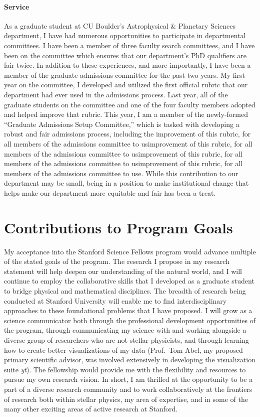 \documentclass[aps, pre, onecolumn, nofootinbib, notitlepage, groupedaddress, amsfonts, amssymb, amsmath]{revtex4-1}
\begin{document}
\paragraph*{Service}
As a graduate student at CU Boulder's Astrophysical \& Planetary Sciences department, I have had numerous opportunities to participate in departmental committees.
I have been a member of three faculty search committees, and I have been on the committee which ensures that our department's PhD qualifiers are fair twice.
In addition to these experiences, and more importantly, I have been a member of the graduate admissions committee for the past two years.
My first year on the committee, I developed and utilized the first official rubric that our department had ever used in the admissions process.
Last year, all of the graduate students on the committee and one of the four faculty members adopted and helped improve that rubric.
This year, I am a member of the newly-formed ``Graduate Admissions Setup Committee,'' which is tasked with developing a robust and fair admissions process, including the improvement of this rubric, for all members of the admissions committee to usimprovement of this rubric, for all members of the admissions committee to usimprovement of this rubric, for all members of the admissions committee to usimprovement of this rubric, for all members of the admissions committee to use.
While this contribution to our department may be small, being in a position to make institutional change that helps make our department more equitable and fair has been a treat.


\section*{Contributions to Program Goals}
\vspace{-12pt}

My acceptance into the Stanford Science Fellows program would advance multiple of the stated goals of the program.
The research I propose in my research statement will help deepen our understanding of the natural world, and I will continue to employ the collaborative skills that I developed as a graduate student to bridge physical and mathematical disciplines.
The breadth of research being conducted at Stanford University will enable me to find interdisciplinary approaches to these foundational problems that I have proposed.
I will grow as a science communicator both through the professional development opportunities of the program, through communicating my science with and working alongside a diverse group of researchers who are not stellar physicists, and through learning how to create better visualizations of my data (Prof.~Tom Abel, my proposed primary scientific advisor, was involved extensively in developing the visualization suite \emph{yt}). 
The fellowship would provide me with the flexibility and resources to pursue my own research vision.
In short, I am thrilled at the opportunity to be a part of a diverse research community and to work collaboratively at the frontiers of research both within stellar physics, my area of expertise, and in some of the many other exciting areas of active research at Stanford.



\end{document}
